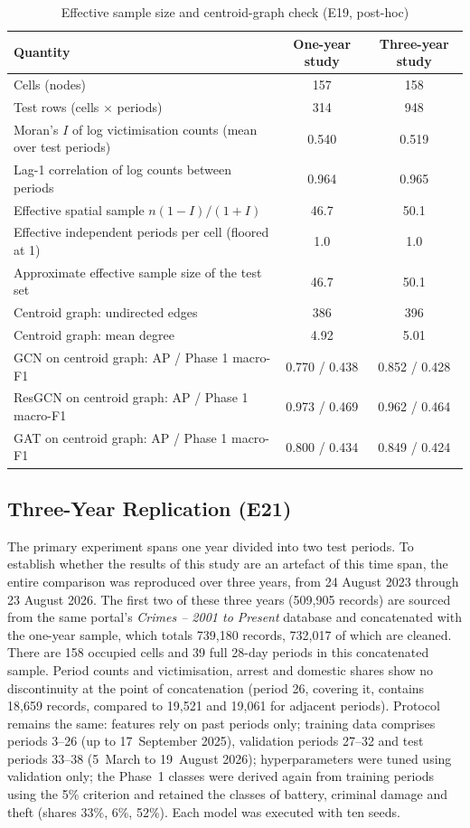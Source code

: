 \documentclass[11pt,a4paper]{report}
\begin{document}
\begin{table}[H]
\centering\small
\caption{Effective sample size and centroid-graph check (E19, post-hoc)}
\label{tab:neff}
\begin{tabular}{@{}lcc@{}}
\toprule
Quantity & One-year study & Three-year study\\
\midrule
Cells (nodes) & 157 & 158\\
Test rows (cells $\times$ periods) & 314 & 948\\
Moran's $I$ of log victimisation counts (mean over test periods) & 0.540 & 0.519\\
Lag-1 correlation of log counts between periods & 0.964 & 0.965\\
Effective spatial sample $n(1-I)/(1+I)$ & 46.7 & 50.1\\
Effective independent periods per cell (floored at 1) & 1.0 & 1.0\\
Approximate effective sample size of the test set & 46.7 & 50.1\\
Centroid graph: undirected edges & 386 & 396\\
Centroid graph: mean degree & 4.92 & 5.01\\
GCN on centroid graph: AP / Phase 1 macro-F1 & 0.770 / 0.438 & 0.852 / 0.428\\
ResGCN on centroid graph: AP / Phase 1 macro-F1 & 0.973 / 0.469 & 0.962 / 0.464\\
GAT on centroid graph: AP / Phase 1 macro-F1 & 0.800 / 0.434 & 0.849 / 0.424\\
\bottomrule
\end{tabular}
\end{table}

\subsection{Three-Year Replication (E21)}
\label{sec:multi}

The primary experiment spans one year divided into two test periods. To establish whether the results of this study are an artefact of this time span, the entire comparison was reproduced over three years, from 24 August 2023 through 23 August 2026. The first two of these three years (509,905 records) are sourced from the same portal's \emph{Crimes -- 2001 to Present} database and concatenated with the one-year sample, which totals 739,180 records, 732,017 of which are cleaned. There are 158 occupied cells and 39 full 28-day periods in this concatenated sample. Period counts and victimisation, arrest and domestic shares show no discontinuity at the point of concatenation (period 26, covering it, contains 18,659 records, compared to 19,521 and 19,061 for adjacent periods). Protocol remains the same: features rely on past periods only; training data comprises periods 3--26 (up to 17~September 2025), validation periods 27--32 and test periods 33--38 (5~March to 19~August 2026); hyperparameters were tuned using validation only; the Phase~1 classes were derived again from training periods using the 5\% criterion and retained the classes of battery, criminal damage and theft (shares 33\%, 6\%, 52\%). Each model was executed with ten seeds.
\end{document}
